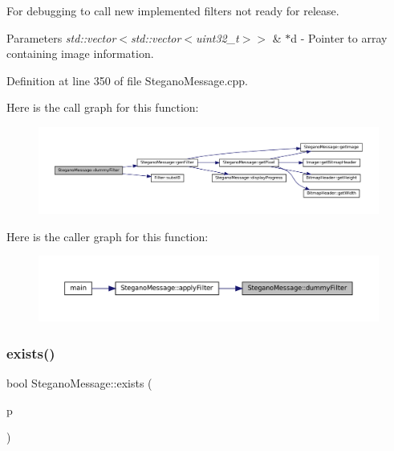 For debugging to call new implemented filters not ready for release. 


\begin{DoxyParams}{Parameters}
{\em std\+::vector$<$std\+::vector$<$uint32\+\_\+t$>$$>$} & $\ast$d -\/ Pointer to array containing image information. \\
\hline
\end{DoxyParams}


Definition at line 350 of file Stegano\+Message.\+cpp.

Here is the call graph for this function\+:\nopagebreak
\begin{figure}[H]
\begin{center}
\leavevmode
\includegraphics[width=350pt]{classSteganoMessage_a1a26242c2e6d146cba1ad6831ab60ba7_cgraph}
\end{center}
\end{figure}
Here is the caller graph for this function\+:\nopagebreak
\begin{figure}[H]
\begin{center}
\leavevmode
\includegraphics[width=350pt]{classSteganoMessage_a1a26242c2e6d146cba1ad6831ab60ba7_icgraph}
\end{center}
\end{figure}
\mbox{\label{classSteganoMessage_acc5a49a35b46d8bf4c40cca8b8c5a52b}} 
\subsubsection{\texorpdfstring{exists()}{exists()}}
{\footnotesize\ttfamily bool Stegano\+Message\+::exists (\begin{DoxyParamCaption}\item[{std\+::string}]{p }\end{DoxyParamCaption})}



